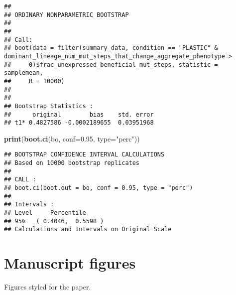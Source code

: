 \documentclass[]{book}
\newenvironment{Shaded}{\begin{snugshade}}{\end{snugshade}}
\newcommand{\DataTypeTok}[1]{\textcolor[rgb]{0.13,0.29,0.53}{#1}}
\newcommand{\FloatTok}[1]{\textcolor[rgb]{0.00,0.00,0.81}{#1}}
\newcommand{\KeywordTok}[1]{\textcolor[rgb]{0.13,0.29,0.53}{\textbf{#1}}}
\newcommand{\NormalTok}[1]{#1}
\newcommand{\StringTok}[1]{\textcolor[rgb]{0.31,0.60,0.02}{#1}}
\begin{document}
\begin{verbatim}
## 
## ORDINARY NONPARAMETRIC BOOTSTRAP
## 
## 
## Call:
## boot(data = filter(summary_data, condition == "PLASTIC" & dominant_lineage_num_mut_steps_that_change_aggregate_phenotype > 
##     0)$frac_unexpressed_beneficial_mut_steps, statistic = samplemean, 
##     R = 10000)
## 
## 
## Bootstrap Statistics :
##      original        bias    std. error
## t1* 0.4827586 -0.0002189655  0.03951968
\end{verbatim}

\begin{Shaded}
\begin{Highlighting}[]
\KeywordTok{print}\NormalTok{(}\KeywordTok{boot.ci}\NormalTok{(bo, }\DataTypeTok{conf=}\FloatTok{0.95}\NormalTok{, }\DataTypeTok{type=}\StringTok{"perc"}\NormalTok{))}
\end{Highlighting}
\end{Shaded}

\begin{verbatim}
## BOOTSTRAP CONFIDENCE INTERVAL CALCULATIONS
## Based on 10000 bootstrap replicates
## 
## CALL : 
## boot.ci(boot.out = bo, conf = 0.95, type = "perc")
## 
## Intervals : 
## Level     Percentile     
## 95%   ( 0.4046,  0.5598 )  
## Calculations and Intervals on Original Scale
\end{verbatim}

\hypertarget{manuscript-figures}{%
\section{Manuscript figures}\label{manuscript-figures}}

Figures styled for the paper.
\end{document}
